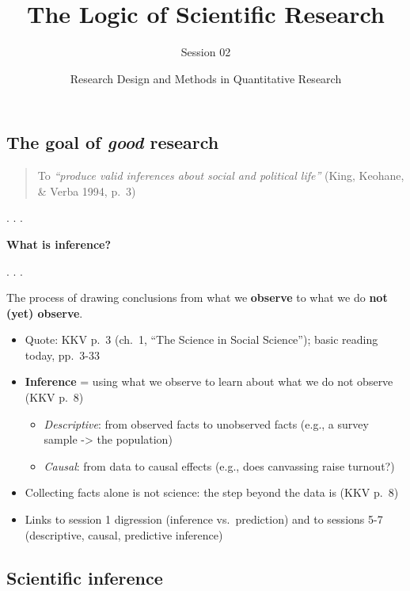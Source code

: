 \documentclass[
  letterpaper,
  DIV=11,
  numbers=noendperiod]{scrartcl}
\title{The Logic of Scientific Research}
\subtitle{Session 02}
\author{Research Design and Methods in Quantitative Research}
\date{}
\providecommand{\tightlist}{%
  \setlength{\itemsep}{0pt}\setlength{\parskip}{0pt}}
\renewcommand*\contentsname{Table of contents}
\newcommand\contentsname{Table of contents}
\begin{document}
\maketitle

\renewcommand*\contentsname{Table of contents}
{
\setcounter{tocdepth}{1}
\tableofcontents
}

\subsection{\texorpdfstring{The goal of \emph{good}
research}{The goal of good research}}\label{the-goal-of-good-research}

\begin{quote}
To \emph{``produce valid inferences about social and political life''}
(King, Keohane, \& Verba 1994, p.~3)
\end{quote}

. . .

\textbf{What is inference?}

. . .

The process of drawing conclusions from what we \textbf{observe} to what
we do \textbf{not (yet) observe}.

\begin{itemize}
\tightlist
\item
  Quote: KKV p.~3 (ch.~1, ``The Science in Social Science''); basic
  reading today, pp.~3-33
\item
  \textbf{Inference} = using what we observe to learn about what we do
  not observe (KKV p.~8)

  \begin{itemize}
  \tightlist
  \item
    \emph{Descriptive}: from observed facts to unobserved facts (e.g., a
    survey sample -\textgreater{} the population)
  \item
    \emph{Causal}: from data to causal effects (e.g., does canvassing
    raise turnout?)
  \end{itemize}
\item
  Collecting facts alone is not science: the step beyond the data is
  (KKV p.~8)
\item
  Links to session 1 digression (inference vs.~prediction) and to
  sessions 5-7 (descriptive, causal, predictive inference)
\end{itemize}

\subsection{Scientific inference}\label{scientific-inference}
\end{document}
